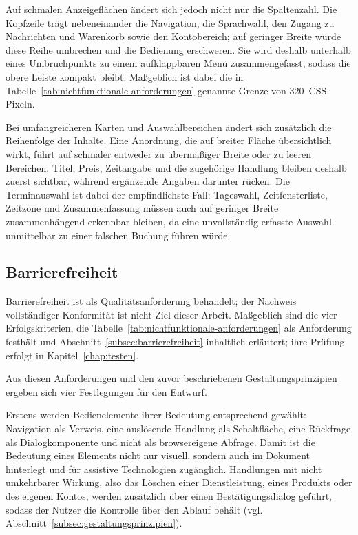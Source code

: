 Auf schmalen Anzeigeflächen ändert sich jedoch nicht nur die
Spaltenzahl. Die Kopfzeile trägt nebeneinander die Navigation, die
Sprachwahl, den Zugang zu Nachrichten und Warenkorb sowie den
Kontobereich; auf geringer Breite würde diese Reihe umbrechen und die
Bedienung erschweren. Sie wird deshalb unterhalb eines Umbruchpunkts
zu einem aufklappbaren Menü zusammengefasst, sodass die obere Leiste
kompakt bleibt. Maßgeblich ist dabei die in
Tabelle~\ref{tab:nichtfunktionale-anforderungen} genannte Grenze von
320~\acs{CSS}-Pixeln.

Bei umfangreicheren Karten und Auswahlbereichen ändert sich zusätzlich
die Reihenfolge der Inhalte. Eine
Anordnung, die auf breiter Fläche übersichtlich wirkt, führt auf
schmaler entweder zu übermäßiger Breite oder zu leeren Bereichen.
Titel, Preis, Zeitangabe und die zugehörige Handlung bleiben deshalb
zuerst sichtbar, während ergänzende Angaben darunter rücken. Die
Terminauswahl ist dabei der empfindlichste Fall: Tageswahl,
Zeitfensterliste, Zeitzone und Zusammenfassung müssen auch auf
geringer Breite zusammenhängend erkennbar bleiben, da eine
unvollständig erfasste Auswahl unmittelbar zu einer falschen Buchung
führen würde.



\subsection{Barrierefreiheit}
\label{subsec:barrierefreiheit_konzept}

Barrierefreiheit ist als Qualitätsanforderung behandelt; der Nachweis
vollständiger Konformität ist nicht Ziel dieser Arbeit. Maßgeblich sind die vier Erfolgskriterien, die
Tabelle~\ref{tab:nichtfunktionale-anforderungen} als Anforderung
festhält und Abschnitt~\ref{subsec:barrierefreiheit} inhaltlich
erläutert; ihre Prüfung erfolgt in Kapitel~\ref{chap:testen}.

Aus diesen Anforderungen und den zuvor beschriebenen
Gestaltungsprinzipien ergeben sich vier Festlegungen für den Entwurf.

Erstens werden Bedienelemente ihrer Bedeutung entsprechend gewählt:
Navigation als Verweis, eine auslösende Handlung als Schaltfläche,
eine Rückfrage als Dialogkomponente und nicht als browsereigene
Abfrage. Damit ist die Bedeutung eines Elements nicht nur visuell,
sondern auch im Dokument hinterlegt und für assistive Technologien
zugänglich. Handlungen mit nicht umkehrbarer Wirkung, also das
Löschen einer Dienstleistung, eines Produkts oder des eigenen Kontos,
werden zusätzlich über einen Bestätigungsdialog geführt, sodass der
Nutzer die Kontrolle über den Ablauf behält (vgl.
Abschnitt~\ref{subsec:gestaltungsprinzipien}).

